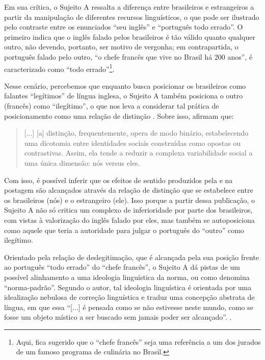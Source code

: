 \documentclass[portuguese]{textolivre}
\begin{document}
Em sua crítica, o Sujeito A ressalta a diferença entre brasileiros e estrangeiros a partir da manipulação de diferentes recursos linguísticos, o que pode ser ilustrado pelo contraste entre os enunciados “seu inglês” e “português todo errado”. O primeiro indica que o inglês falado pelos brasileiros é tão válido quanto qualquer outro, não devendo, portanto, ser motivo de vergonha; em contrapartida, o português falado pelo outro, “o chefe francês que vive no Brasil há 200 anos”, é caracterizado como “todo errado”\footnote{Aqui, fica sugerido que o “chefe francês” seja uma referência a um dos jurados de um famoso programa de culinária no Brasil.}.							

Nesse cenário, percebemos que enquanto busca posicionar os brasileiros como falantes “legítimos” de língua inglesa, o Sujeito A também posiciona o outro (francês) como “ilegítimo”, o que nos leva a considerar tal prática de posicionamento como uma relação de distinção \cite{bucholtz_language_2004,bucholtz_identity_2005}. Sobre isso, \textcite[p. 384]{bucholtz_language_2004} afirmam que:

\begin{quote}
    [...] [a] distinção, frequentemente, opera de modo binário, estabelecendo uma dicotomia entre identidades sociais construídas como opostas ou contrastivas. Assim, ela tende a reduzir a complexa variabilidade social a uma única dimensão: nós versus eles.
\end{quote}

Com isso, é possível inferir que os efeitos de sentido produzidos pela e na postagem são alcançados através da relação de distinção que se estabelece entre os brasileiros (nós) e o estrangeiro (ele). Isso porque a partir dessa publicação, o Sujeito A não só critica um complexo de inferioridade por parte dos brasileiros, com vistas à valorização do inglês falado por eles, mas também se autoposiciona como aquele que teria a autoridade para julgar o português do “outro” como ilegítimo.	

Orientado pela relação de deslegitimação, que é alcançada pela sua posição frente ao português “todo errado” do “chefe francês”, o Sujeito A dá pistas de um possível alinhamento a uma ideologia linguística da norma, ou como \textcite{bagno_inevitavel_2002} denomina “norma-padrão”. Segundo o autor, tal ideologia linguística é orientada por uma idealização nebulosa de correção linguística e traduz uma concepção abstrata de língua, em que essa “[...] é pensada como se não estivesse neste mundo, como se fosse um objeto místico a ser buscado sem jamais poder ser alcançado”. \cite[p. 22]{bagno_inevitavel_2002}.									
\end{document}
